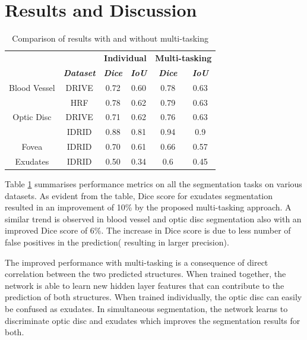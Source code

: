 \documentclass{article}
\begin{document}
\section{Results and Discussion}\label{sec:results}
\vspace{-0.2in}
\begin{table}[htbp]
\caption{Comparison of results with and without multi-tasking}
\begin{center}
\begin{tabular}{|c|c|c|c|c|c|}
\hline
&&\multicolumn{2}{|c|}{\textbf{Individual}}& \multicolumn{2}{|c|}{\textbf{Multi-tasking}} \\
\cline{3-6}
 &\textbf{\textit{Dataset}}& \textbf{\textit{Dice}}& \textbf{\textit{IoU}}& \textbf{\textit{Dice}}& \textbf{\textit{IoU}}  \\
\hline
Blood Vessel&DRIVE &0.72&0.60 &0.78&0.63  \\
\cline{2-6}
&HRF&0.78&0.62&0.79&0.63 \\
\hline
Optic Disc& DRIVE&0.71&0.62 &0.76&0.63  \\
\cline{2-6}
&IDRID&0.88&0.81&0.94&0.9 \\
\hline
Fovea&IDRID&0.70&0.61 &0.66 &0.57  \\
\hline
Exudates&IDRID&0.50&0.34 &0.6&0.45  \\
\hline
\end{tabular}
\label{tab:results}
\end{center}
\end{table}

Table \ref{tab:results} summarises performance metrics on all the segmentation tasks on various datasets.
As evident from the table,  Dice score for exudates segmentation resulted in an improvement  of 10\% by the proposed multi-tasking approach.
A similar trend is observed in blood vessel and optic disc segmentation also with an improved Dice score of 6\%.
The increase in Dice score is due to less number of false positives in the prediction( resulting in larger precision).


The improved performance with multi-tasking is a consequence of direct correlation between the two predicted structures.
When trained together, the network is able to learn new hidden layer features that can contribute to the prediction of both structures.
When trained individually, the optic disc can easily be confused as exudates.
In simultaneous segmentation, the network learns to discriminate optic disc and exudates which improves the segmentation results for both.
\end{document}
